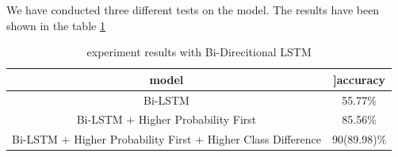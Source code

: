 \documentclass{standalone}
\begin{document}
We have conducted three different tests on the model. The results have been shown in the table \ref{res4}
\begin{table}[h!]
        \centering
        \begin{tabular}{|c|c|}
            \hline
            \textbf{model} & ]\textbf{accuracy} \\ [1ex]
            \hline
            Bi-LSTM & 55.77\% \\
            \hline
            Bi-LSTM + Higher Probability First & 85.56\%\\
            \hline
            Bi-LSTM + Higher Probability First + Higher Class
            Difference & 90(89.98)\%  \\ 
            \hline
        \end{tabular}
        \caption{experiment results with Bi-Direcitional LSTM}
        \label{res4}
        \end{table}
\end{document}
